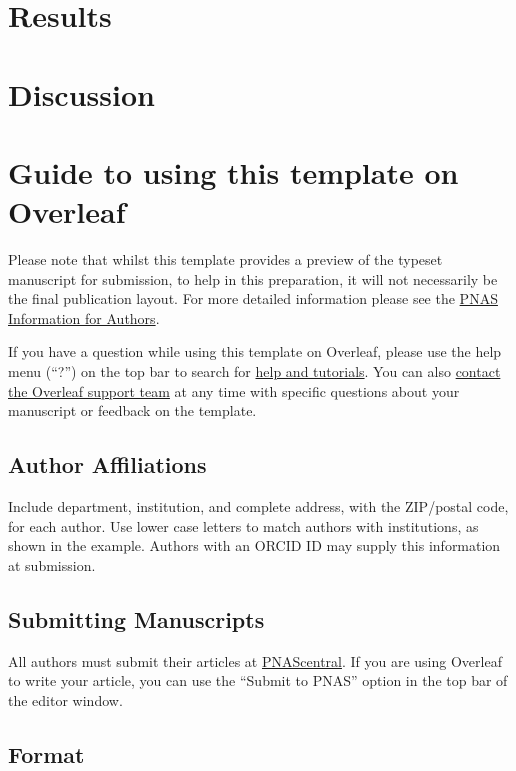 \documentclass[9pt,twocolumn,twoside,lineno]{pnas-new}
\begin{document}
\section*{Results}

\section*{Discussion}

\section*{Guide to using this template on Overleaf}

Please note that whilst this template provides a preview of the typeset manuscript for submission, to help in this preparation, it will not necessarily be the final publication layout. For more detailed information please see the \href{http://www.pnas.org/site/authors/format.xhtml}{PNAS Information for Authors}.

If you have a question while using this template on Overleaf, please use the help menu (``?'') on the top bar to search for \href{https://www.overleaf.com/help}{help and tutorials}. You can also \href{https://www.overleaf.com/contact}{contact the Overleaf support team} at any time with specific questions about your manuscript or feedback on the template.

\subsection*{Author Affiliations}

Include department, institution, and complete address, with the ZIP/postal code, for each author. Use lower case letters to match authors with institutions, as shown in the example. Authors with an ORCID ID may supply this information at submission.

\subsection*{Submitting Manuscripts}

All authors must submit their articles at \href{http://www.pnascentral.org/cgi-bin/main.plex}{PNAScentral}. If you are using Overleaf to write your article, you can use the ``Submit to PNAS'' option in the top bar of the editor window. 

\subsection*{Format}
\end{document}
